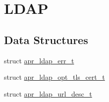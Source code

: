 \hypertarget{group___a_p_r___util___l_d_a_p}{\section{L\-D\-A\-P}
\label{group___a_p_r___util___l_d_a_p}
}
\subsection*{Data Structures}
\begin{DoxyCompactItemize}
\item 
struct \hyperlink{structapr__ldap__err__t}{apr\-\_\-ldap\-\_\-err\-\_\-t}
\item 
struct \hyperlink{structapr__ldap__opt__tls__cert__t}{apr\-\_\-ldap\-\_\-opt\-\_\-tls\-\_\-cert\-\_\-t}
\item 
struct \hyperlink{structapr__ldap__url__desc__t}{apr\-\_\-ldap\-\_\-url\-\_\-desc\-\_\-t}
\end{DoxyCompactItemize}
